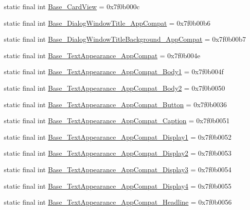 \begin{CompactItemize}
\item 
static final int \hyperlink{classandroid_1_1support_1_1v4_1_1_r_1_1style_c1ac9cad59f4289229d8a99f48130216}{Base\_\-CardView} = 0x7f0b000c
\item 
static final int \hyperlink{classandroid_1_1support_1_1v4_1_1_r_1_1style_787c5083322e91f0ebf98133834a5edd}{Base\_\-DialogWindowTitle\_\-AppCompat} = 0x7f0b00b6
\item 
static final int \hyperlink{classandroid_1_1support_1_1v4_1_1_r_1_1style_90108de9969a03758214a6e537dfece9}{Base\_\-DialogWindowTitleBackground\_\-AppCompat} = 0x7f0b00b7
\item 
static final int \hyperlink{classandroid_1_1support_1_1v4_1_1_r_1_1style_b5252adbcae4efd31cf33958dc8cb443}{Base\_\-TextAppearance\_\-AppCompat} = 0x7f0b004e
\item 
static final int \hyperlink{classandroid_1_1support_1_1v4_1_1_r_1_1style_22187a8eb29d4557e372f9747339c998}{Base\_\-TextAppearance\_\-AppCompat\_\-Body1} = 0x7f0b004f
\item 
static final int \hyperlink{classandroid_1_1support_1_1v4_1_1_r_1_1style_a51834f837d4c1159a7a8784d8b19ebf}{Base\_\-TextAppearance\_\-AppCompat\_\-Body2} = 0x7f0b0050
\item 
static final int \hyperlink{classandroid_1_1support_1_1v4_1_1_r_1_1style_aa2c22e2f18a2fc2ebbcada99c2c62c2}{Base\_\-TextAppearance\_\-AppCompat\_\-Button} = 0x7f0b0036
\item 
static final int \hyperlink{classandroid_1_1support_1_1v4_1_1_r_1_1style_d568f1f4e79da0eb8232f1401489ee33}{Base\_\-TextAppearance\_\-AppCompat\_\-Caption} = 0x7f0b0051
\item 
static final int \hyperlink{classandroid_1_1support_1_1v4_1_1_r_1_1style_99a5017c390b738be257a3f86530973a}{Base\_\-TextAppearance\_\-AppCompat\_\-Display1} = 0x7f0b0052
\item 
static final int \hyperlink{classandroid_1_1support_1_1v4_1_1_r_1_1style_7879010eef72933493a74f1391a358d4}{Base\_\-TextAppearance\_\-AppCompat\_\-Display2} = 0x7f0b0053
\item 
static final int \hyperlink{classandroid_1_1support_1_1v4_1_1_r_1_1style_3ce61c29d369f1c31e70d5dabc9bfe82}{Base\_\-TextAppearance\_\-AppCompat\_\-Display3} = 0x7f0b0054
\item 
static final int \hyperlink{classandroid_1_1support_1_1v4_1_1_r_1_1style_955895915a569f0230f152696f32eec2}{Base\_\-TextAppearance\_\-AppCompat\_\-Display4} = 0x7f0b0055
\item 
static final int \hyperlink{classandroid_1_1support_1_1v4_1_1_r_1_1style_72576930cb3097d13b8c469938fa16a9}{Base\_\-TextAppearance\_\-AppCompat\_\-Headline} = 0x7f0b0056

\end{CompactItemize}
